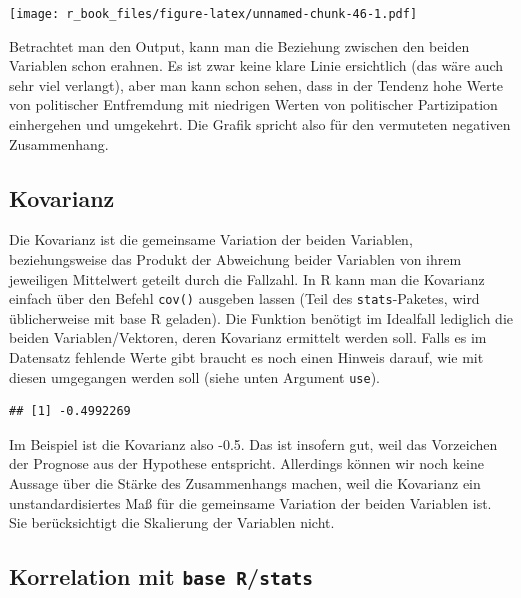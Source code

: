 \documentclass[
]{book}
\newenvironment{Shaded}{\begin{snugshade}}{\end{snugshade}}
\newcommand{\FunctionTok}[1]{\textcolor[rgb]{0.00,0.00,0.00}{#1}}
\newcommand{\NormalTok}[1]{#1}
\newcommand{\SpecialCharTok}[1]{\textcolor[rgb]{0.00,0.00,0.00}{#1}}
\begin{document}
\texttt{[image: r\_book\_files/figure-latex/unnamed-chunk-46-1.pdf]}

Betrachtet man den Output, kann man die Beziehung zwischen den beiden Variablen schon erahnen. Es ist zwar keine klare Linie ersichtlich (das wäre auch sehr viel verlangt), aber man kann schon sehen, dass in der Tendenz hohe Werte von politischer Entfremdung mit niedrigen Werten von politischer Partizipation einhergehen und umgekehrt. Die Grafik spricht also für den vermuteten negativen Zusammenhang.

\hypertarget{kovarianz}{%
\subsection{Kovarianz}\label{kovarianz}}

Die Kovarianz ist die gemeinsame Variation der beiden Variablen, beziehungsweise das Produkt der Abweichung beider Variablen von ihrem jeweiligen Mittelwert geteilt durch die Fallzahl. In R kann man die Kovarianz einfach über den Befehl \texttt{cov()} ausgeben lassen (Teil des \texttt{stats}-Paketes, wird üblicherweise mit base R geladen). Die Funktion benötigt im Idealfall lediglich die beiden Variablen/Vektoren, deren Kovarianz ermittelt werden soll. Falls es im Datensatz fehlende Werte gibt braucht es noch einen Hinweis darauf, wie mit diesen umgegangen werden soll (siehe unten Argument \texttt{use}).

\begin{Shaded}
\end{Shaded}

\begin{verbatim}
## [1] -0.4992269
\end{verbatim}

Im Beispiel ist die Kovarianz also -0.5. Das ist insofern gut, weil das Vorzeichen der Prognose aus der Hypothese entspricht. Allerdings können wir noch keine Aussage über die Stärke des Zusammenhangs machen, weil die Kovarianz ein unstandardisiertes Maß für die gemeinsame Variation der beiden Variablen ist. Sie berücksichtigt die Skalierung der Variablen nicht.

\hypertarget{korrelation-mit-base-rstats}{%
\subsection{\texorpdfstring{Korrelation mit \texttt{base\ R}/\texttt{stats}}{Korrelation mit base R/stats}}\label{korrelation-mit-base-rstats}}
\end{document}

